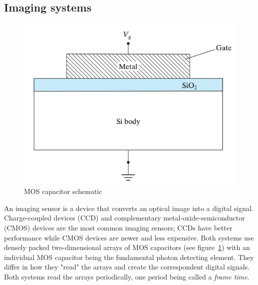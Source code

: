 \subsection{Imaging systems}\label{subsec:imaging-systems}
\begin{figure}
    \includegraphics[width=\linewidth,keepaspectratio]{figures/mos_cap.png}
    \caption{MOS capacitor schematic\cite{semiconductorbook}}
    \label{fig:mos-cap}
\end{figure}
An imaging sensor is a device that converts an optical image into a digital signal.
%
Charge-coupled devices (CCD) and complementary metal-oxide-semiconductor (CMOS) devices are the most common imaging sensors; CCDs have better performance while CMOS devices are newer and less expensive.
%
Both systems use densely packed two-dimensional arrays of MOS capacitors (see figure~\ref{fig:mos-cap}) with an individual MOS capacitor being the fundamental photon detecting element.
%
They differ in how they "read" the arrays and create the correspondent digital signals.
%
Both systems read the arrays periodically, one period being called a \textit{frame time}.

